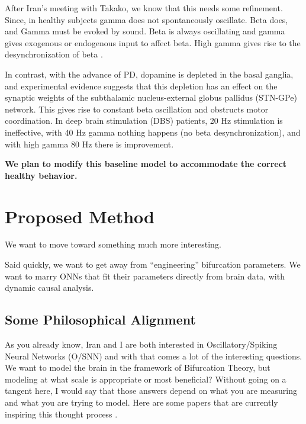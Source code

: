 \documentclass[usletter,12pt]{article} %
\begin{document}
\noindent 
After Iran's meeting with Takako, we know that this needs some refinement.  Since, in healthy subjects gamma does not spontaneously oscillate. Beta does, and Gamma must be evoked by sound.  Beta is always oscillating and gamma gives exogenous or endogenous input to affect beta. High gamma gives rise to the desynchronization of beta \cite{jenkinson2011new}. 

\noindent 
In contrast, with the advance of PD, dopamine is depleted in the basal ganglia, and experimental evidence suggests that this depletion has an effect on the synaptic weights of the subthalamic nucleus-external globus pallidus (STN-GPe) network. This gives rise to constant beta oscillation and obstructs motor coordination.  In deep brain stimulation (DBS) patients, 20 Hz stimulation is ineffective, with 40 Hz gamma nothing happens (no beta desynchronization), and with high gamma 80 Hz there is improvement. 

\noindent 
\textbf{We plan to modify this baseline model to accommodate the correct healthy behavior.}



\section{Proposed Method} \label{proposed-method}

\noindent 
We want to move toward something much more interesting.

\noindent 
Said quickly, we want to get away from “engineering” bifurcation parameters.  We want to marry ONNs that fit their parameters directly from brain data, with dynamic causal analysis. 


\subsection{Some Philosophical Alignment}

\noindent 
As you already know, Iran and I are both interested in Oscillatory/Spiking Neural Networks (O/SNN) and with that comes a lot of the interesting questions. 
We want to model the brain in the framework of Bifurcation Theory, but modeling at what scale is appropriate or most beneficial?  Without going on a tangent here, I would say that those answers depend on what you are measuring and what you are trying to model.  Here are some papers that are currently inspiring this thought process \cite{izhikevich2004model} \cite{izhikevich2008large} \cite{large2015neural}. 
\end{document}
